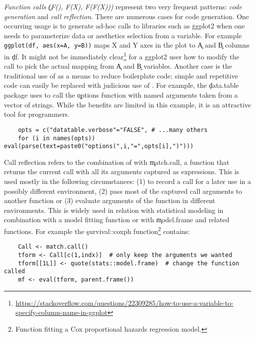 \documentclass[review,screen,acmsmall,anonymous=true]{acmart}
\begin{document}
\begin{compactitem}[---]
  \item \emph{Function calls \c{(F(), F(X), F(F(X)))}} represent two very
    frequent patterns: \emph{code generation} and \emph{call reflection}. There are numerous
    cases for code generation. One occurring usage is to generate ad-hoc calls
    to libraries such as \c{ggplot2} when one needs to parameterize data or
    aesthetics selection from a variable. For example \lstinline|ggplot(df, aes(x=A, y=B))|
    maps X and Y axes in the plot to \c{A} and \c{B} columns in
    \c{df}. It might not be immediately clear\footnote{\cf
    \url{https://stackoverflow.com/questions/22309285/how-to-use-a-variable-to-specify-column-name-in-ggplot}}  for a ggplot2 user
    how to modify the call to pick the actual mapping from \c{A} and \c{B}
    variables. Another case is the traditional use of \eval as a means to
    reduce boilerplate code; simple and repetitive code can easily be replaced
    with judicious use of \eval. For example, the \c{data.table} package uses
    \eval to call the \c{options} function with named arguments taken from a
    vector of strings. While the benefits are limited in this example, it is an
    attractive tool for programmers.
    \begin{lstlisting}
    opts = c("datatable.verbose"="FALSE", # ...many others
    for (i in names(opts)) eval(parse(text=paste0("options(",i,"=",opts[i],")")))
    \end{lstlisting}

    Call reflection refers to the combination of \eval with \c{match.call}, a
    function that returns the current call with all its arguments captured as
    expressions. This is used mostly in the following circumstances: (1) to
    record a call for a later use in a possibly different environment, (2) pass
    most of the captured call arguments to another function or (3) evaluate
    arguments of the function in different environments. This is widely used in
    relation with statistical modeling in combination with a model fitting
    function or with \c{model.frame} and related functions. For example the
    \c{survival::coxph} function\footnote{Function fitting a Cox proportional hazards
    regression model.} contains:
    \begin{lstlisting}
    Call <- match.call()
    tform <- Call[c(1,indx)]  # only keep the arguments we wanted
    tform[[1L]] <- quote(stats::model.frame)  # change the function called
    mf <- eval(tform, parent.frame())
    \end{lstlisting}


\end{compactitem}
\end{document}
